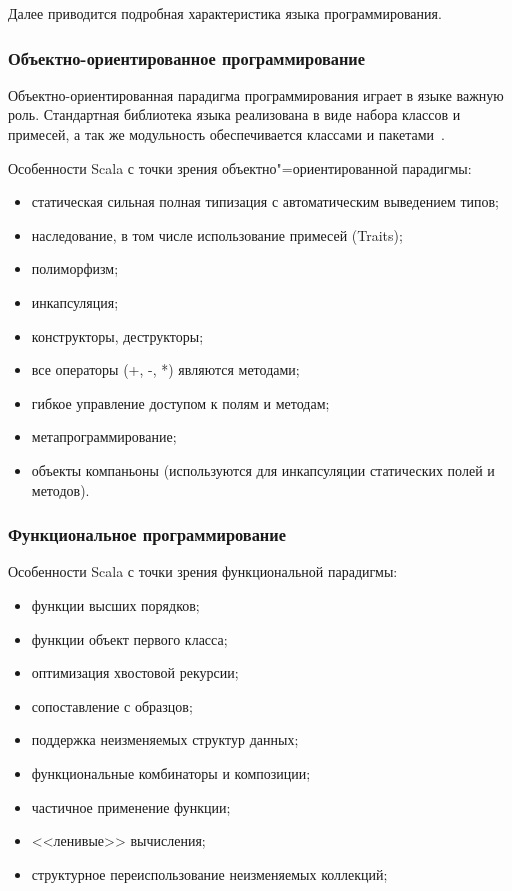 Далее приводится подробная характеристика языка программирования.

\subsubsection{Объектно-ориентированное программирование}
Объектно-ориентированная парадигма программирования играет в языке важную роль. Стандартная библиотека языка реализована в виде набора классов и примесей, а так же модульность обеспечивается классами и пакетами~\cite{horsman_scala}.

Особенности Scala с точки зрения объектно"=ориентированной парадигмы:
\begin{itemize}
  \item статическая сильная полная типизация с автоматическим выведением типов;
  \item наследование, в том числе использование примесей (Traits);
  \item полиморфизм;
  \item инкапсуляция;
  \item конструкторы, деструкторы;
  \item все операторы (+, -, *) являются методами;
  \item гибкое управление доступом к полям и методам;
  \item метапрограммирование;
  \item объекты компаньоны (используются для инкапсуляции статических полей и методов).
\end{itemize}

\subsubsection{Функциональное программирование}
Особенности Scala с точки зрения функциональной парадигмы:
\begin{itemize}
  \item функции высших порядков;
  \item функции объект первого класса;
  \item оптимизация хвостовой рекурсии;
  \item сопоставление с образцов;
  \item поддержка неизменяемых структур данных;
  \item функциональные комбинаторы и композиции;
  \item частичное применение функции;
  \item <<ленивые>> вычисления;
  \item структурное переиспользование неизменяемых коллекций;
\end{itemize}

